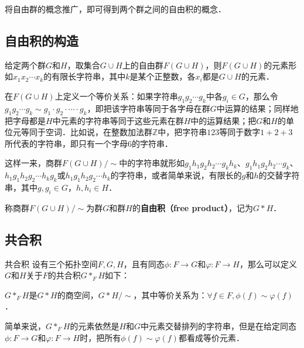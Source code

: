 
将自由群的概念推广，即可得到两个群之间的自由积的概念．

\subsection{自由积的构造}

给定两个群$G$和$H$，取集合$G\cup H$上的自由群$F(G\cup H)$，则$F(G\cup H)$的元素形如$x_1x_2\cdots x_k$的有限长字符串，其中$k$是某个正整数，各$x_i$都是$G\cup H$的元素．

在$F(G\cup H)$上定义一个等价关系：如果字符串$g_1g_2\cdots g_k$中各$g_i\in G$，那么令$g_1g_2\cdots g_k\sim g_1\cdot g_2\cdot\cdots\cdot g_k$，即把该字符串等同于各字母在群$G$中运算的结果；同样地把字母都是$H$中元素的字符串等同于这些元素在群$H$中的运算结果；把$G$和$H$的单位元等同于空词．比如说，在整数加法群$\mathbb{Z}$中，把字符串$123$等同于数字$1+2+3$所代表的字符串，即只有一个字母$6$的字符串．

这样一来，商群$F(G\cup H)/\sim$中的字符串就形如$g_1h_1g_2h_2\cdots g_kh_k$、$g_1h_1g_2h_2\cdots g_k$、$h_1g_1h_2g_2\cdots h_kg_k$或$h_1g_1h_2g_2\cdots h_k$的字符串，或者简单来说，有限长的$g$和$h$的交替字符串，其中$g, g_i\in G$，$h, h_i\in H$．

称商群$F(G\cup H)/\sim$为群$G$和群$H$的\textbf{自由积（free product）}，记为$G*H$．

\subsection{共合积}
\begin{definition}{共合积}
设有三个拓扑空间$F, G, H$，且有同态$\phi:F\rightarrow G$和$\varphi:F\rightarrow H$，那么可以定义$G$和$H$关于$F$的共合积$G*_FH$如下：

$G*_FH$是$G*H$的商空间，$G*H/\sim$，其中等价关系为：$\forall f\in F, \phi(f)\sim\varphi(f)$．
\end{definition}

简单来说，$G*_FH$的元素依然是$H$和$G$中元素交替排列的字符串，但是在给定同态$\phi:F\rightarrow G$和$\varphi:F\rightarrow H$时，把所有$\phi(f)\sim\varphi(f)$都看成等价元素．


